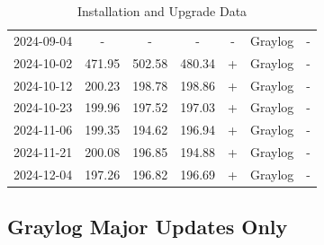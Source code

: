 \documentclass[../main.tex]{subfiles}
\begin{document}
\begin{table}[h]
\begin{tabular}{|c|c|c|c|c|c|c|}
        2024-09-04 & - & - & - & - & Graylog & - \\
        2024-10-02 & 471.95 & 502.58 & 480.34 & + & Graylog & - \\
        2024-10-12 & 200.23 & 198.78 & 198.86 & + & Graylog & - \\
        2024-10-23 & 199.96 & 197.52 & 197.03 & + & Graylog & - \\
        2024-11-06 & 199.35 & 194.62 & 196.94 & + & Graylog & - \\
        2024-11-21 & 200.08 & 196.85 & 194.88 & + & Graylog & - \\
        2024-12-04 & 197.26 & 196.82 & 196.69 & + & Graylog & - \\
                \hline
    \end{tabular}
    \caption{Installation and Upgrade Data}
    \label{tab:graylog_results_2024}
\end{table}

\subsection{Graylog Major Updates Only}
\end{document}
